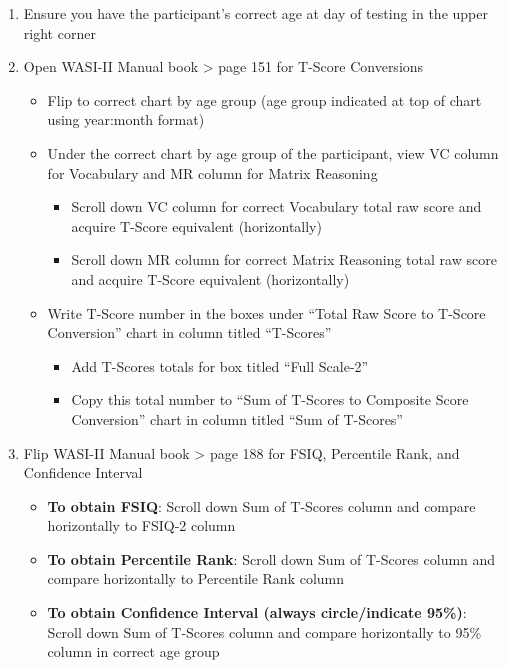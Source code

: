 \documentclass[
]{book}
\providecommand{\tightlist}{%
  \setlength{\itemsep}{0pt}\setlength{\parskip}{0pt}}
\begin{document}
\begin{enumerate}
\def\labelenumi{\arabic{enumi}.}
\tightlist
\item
  Ensure you have the participant's correct age at day of testing in the upper right corner
\item
  Open WASI-II Manual book \textgreater{} page 151 for T-Score Conversions

  \begin{itemize}
  \tightlist
  \item
    Flip to correct chart by age group (age group indicated at top of chart using year:month format)
  \item
    Under the correct chart by age group of the participant, view VC column for Vocabulary and MR column for Matrix Reasoning

    \begin{itemize}
    \tightlist
    \item
      Scroll down VC column for correct Vocabulary total raw score and acquire T-Score equivalent (horizontally)
    \item
      Scroll down MR column for correct Matrix Reasoning total raw score and acquire T-Score equivalent (horizontally)
    \end{itemize}
  \item
    Write T-Score number in the boxes under ``Total Raw Score to T-Score Conversion'' chart in column titled ``T-Scores''

    \begin{itemize}
    \tightlist
    \item
      Add T-Scores totals for box titled ``Full Scale-2''
    \item
      Copy this total number to ``Sum of T-Scores to Composite Score Conversion'' chart in column titled ``Sum of T-Scores''
    \end{itemize}
  \end{itemize}
\item
  Flip WASI-II Manual book \textgreater{} page 188 for FSIQ, Percentile Rank, and Confidence Interval

  \begin{itemize}
  \tightlist
  \item
    \textbf{To obtain FSIQ}: Scroll down Sum of T-Scores column and compare horizontally to FSIQ-2 column
  \item
    \textbf{To obtain Percentile Rank}: Scroll down Sum of T-Scores column and compare horizontally to Percentile Rank column
  \item
    \textbf{To obtain Confidence Interval (always circle/indicate 95\%)}: Scroll down Sum of T-Scores column and compare horizontally to 95\% column in correct age group
  \end{itemize}
\end{enumerate}
\end{document}
